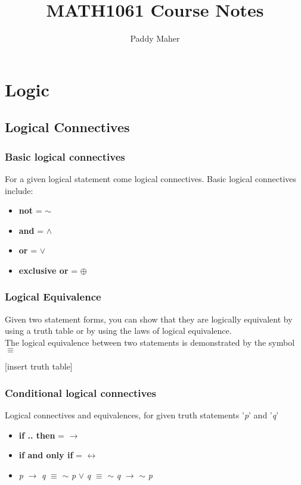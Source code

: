 \documentclass{article}
\title{MATH1061 Course Notes}
\author{Paddy Maher}
\begin{document}
\maketitle
\newpage

\section{Logic}
\subsection{Logical Connectives}
\subsubsection{Basic logical connectives}
For a given logical statement come logical connectives. Basic logical connectives include:
\begin{itemize}
\item \textbf{not} = $\sim$
\item \textbf{and} = $\wedge$
\item \textbf{or} = $\lor$
\item \textbf{exclusive or} = $\oplus$
\end{itemize}

\subsubsection{Logical Equivalence}
Given two statement forms, you can show that they are logically equivalent by using a truth table or by using 
the laws of logical equivalence. \\
The logical equivalence between two statements is demonstrated by the symbol $\equiv$

[insert truth table]

\subsubsection{Conditional logical connectives}
Logical connectives and equivalences, for given truth statements '\textit{p}' and '\textit{q}'
\begin{itemize}
\item \textbf{if .. then} = $\rightarrow$
\item \textbf{if and only if} = $\leftrightarrow$
\item \textit{p} $\rightarrow$ \textit{q} $\equiv$ 
$\sim$ \textit{p} $\lor$ \textit{q} $\equiv$ 
$\sim$ \textit{q} $\rightarrow$ $\sim$ \textit{p}
\end{itemize}
\end{document}
